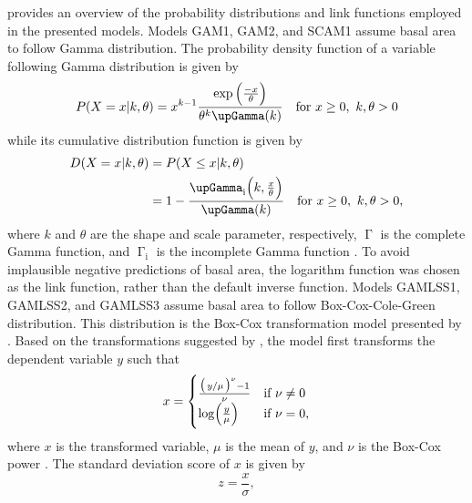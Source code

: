  provides an overview of the probability distributions and link functions employed in the presented models.  Models GAM1, GAM2, and SCAM1 assume basal area to follow Gamma distribution.  The probability density function of a variable following Gamma distribution is given by
\begin{equation}
  \label{eq:GammaDistributionPDF}
  P(X = x|k, \theta) = x^{k - 1} \frac{\exp{\Bigl(\frac{-x}{\theta}\Bigr)}}{\theta^k \upGamma(k)} \quad \text{for } x \geq 0, ~ k, \theta > 0
\end{equation}
while its  cumulative distribution function is given by
\begin{equation}
  \label{eq:GammaDistributionCDF}
  \begin{aligned}[b]
    D(X = x|k, \theta) &= P(X \leq x|k, \theta) \\
    &= 1 - \frac{\upGamma_{\text{i}}\Bigl(k, \frac{x}{\theta}\Bigr)}{\upGamma(k)} \quad \text{for } x \geq 0, ~ k, \theta > 0,
  \end{aligned}
\end{equation}
where \(k\) and \(\theta\) are the shape and scale parameter, respectively, \(\upGamma\) is the complete Gamma function, and \(\upGamma_{\text{i}}\) is the incomplete Gamma function \parencite{Weisstein2017b,Dormann2013,Lindgren1976}.  To avoid implausible negative predictions of basal area, the logarithm function was chosen as the link function, rather than the default inverse function.  Models GAMLSS1, GAMLSS2, and GAMLSS3 assume basal area to follow Box-Cox-Cole-Green distribution. This distribution is the Box-Cox transformation model presented by \textcite{Cole1992} \parencite{Stasinopoulos2007}.  Based on the transformations suggested by \textcite{Box1964}, the model first transforms the dependent variable \(y\) such that
\begin{equation}
  \label{eq:BoxCoxColeGreenTransformation}
  x =
  \begin{cases}
    \frac{
      \bigl(\left.
        y \middle/ \mu
      \right.\bigr)^\nu - 1}{\nu} &\text{if } \nu \not = 0 \\
    \log\Bigl(\frac{y}{\mu}\Bigr) &\text{if } \nu = 0,
  \end{cases}
\end{equation}
where \(x\) is the transformed variable, \(\mu\) is the mean of \(y\),
and \(\nu\) is the Box-Cox power \parencite{Cole1992}.
The standard deviation score of \(x\) is given by
\begin{equation}
  \label{eq:BoxCoxColeGreenSDScore}
  z = \frac{x}{\sigma},
\end{equation}
